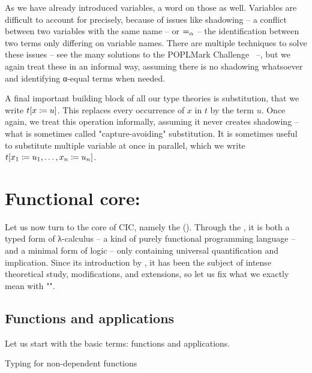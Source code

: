 \AP As we have already introduced variables, a word on those as well. Variables are difficult
to account for precisely, because of issues like shadowing – a conflict between two variables
with the same name – or  $=_{\alpha}$ – the identification between two terms
only differing on variable names. There are multiple techniques to solve these issues
– see the many solutions to the POPLMark Challenge~ –, 
but we again treat these in an informal way, assuming
there is no shadowing whatsoever and identifying α-equal terms when needed.%

A final important building block of all our type theories is substitution,
that we write $t[x \coloneqq u]$. This replaces every occurrence of $x$ in $t$ by the term
$u$. Once again, we treat this operation informally, assuming it never creates
shadowing – what is sometimes called "capture-avoiding" substitution.
It is sometimes useful to substitute multiple variable at once in parallel,
which we write $t[x_1 \coloneqq u_1, \dots, x_n \coloneqq u_n]$.

\section{Functional core: }
\label{sec:tech-ccw}

\AP Let us now turn to the core of CIC, namely the
 (). Through the ,
it is both a typed form of λ-calculus – \ie a kind of purely functional
programming language – and a minimal form
of logic – only containing universal quantification and implication.
Since its introduction by , it has been the subject of intense
theoretical study, modifications, and extensions, so let us fix what we exactly mean
with "".

\subsection{Functions and applications}

Let us start with the basic terms: functions and applications.

\begin{marginfigure}
  \caption{Typing for non-dependent functions}
  \label{fig:cic-nondep-fun}
\end{marginfigure}

